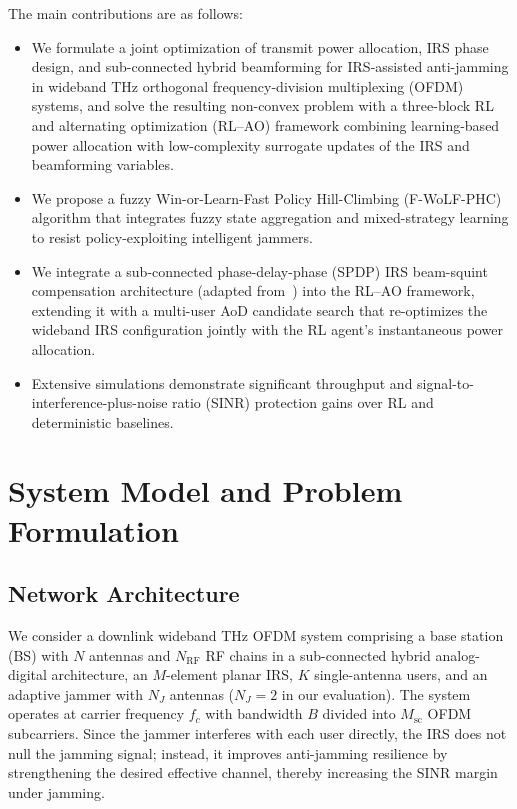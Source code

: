 \documentclass[10pt,conference]{IEEEtran}
\DeclareMathOperator{\diag}{diag}
\begin{document}
The main contributions are as follows:
\begin{itemize}
\item We formulate a joint optimization of transmit power allocation, IRS phase design, and sub-connected hybrid beamforming for IRS-assisted anti-jamming in wideband THz orthogonal frequency-division multiplexing (OFDM) systems, and solve the resulting non-convex problem with a three-block RL and alternating optimization (RL--AO) framework combining learning-based power allocation with low-complexity surrogate updates of the IRS and beamforming variables.

\item We propose a fuzzy Win-or-Learn-Fast Policy Hill-Climbing (F-WoLF-PHC) algorithm that integrates fuzzy state aggregation and mixed-strategy learning to resist policy-exploiting intelligent jammers.

\item We integrate a sub-connected phase-delay-phase (SPDP) IRS beam-squint compensation architecture (adapted from~\cite{su2023wideband}) into the RL--AO framework, extending it with a multi-user AoD candidate search that re-optimizes the wideband IRS configuration jointly with the RL agent's instantaneous power allocation.

\item Extensive simulations demonstrate significant throughput and signal-to-interference-plus-noise ratio (SINR) protection gains over RL and deterministic baselines.
\end{itemize}
\section{System Model and Problem Formulation}
\label{sec:system}
\subsection{Network Architecture}
We consider a downlink wideband THz OFDM system comprising a base station (BS) with $N$ antennas and $N_{\mathrm{RF}}$ RF chains in a sub-connected hybrid analog-digital architecture, an $M$-element planar IRS, $K$ single-antenna users, and an adaptive jammer with $N_J$ antennas ($N_J=2$ in our evaluation). The system operates at carrier frequency $f_c$ with bandwidth $B$ divided into $M_{\mathrm{sc}}$ OFDM subcarriers. Since the jammer interferes with each user directly, the IRS does not null the jamming signal; instead, it improves anti-jamming resilience by strengthening the desired effective channel, thereby increasing the SINR margin under jamming.
\end{document}
